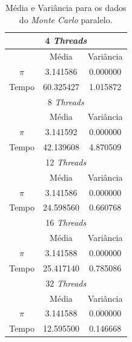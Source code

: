 \documentclass[11pt,twoside]{article}
\begin{document}
        \begin{table}[ht]
        \centering
            \begin{tabular}{|c|c|c|}
            \hline
            
            \multicolumn{3}{|c|}{ 4 {\it Threads} } \\ \hline
            
             & Média & Variância \\ \hline
             $\pi$ & 3.141586 & 0.000000 \\ \hline
            Tempo & 60.325427 & 1.015872 \\ \hline
            
            \multicolumn{3}{|c|}{ 8 {\it Threads} } \\ \hline
            
             & Média & Variância \\ \hline
            $\pi$ & 3.141592 & 0.000000 \\ \hline
            Tempo & 42.139608 & 4.870509 \\ \hline
            
            \multicolumn{3}{|c|}{ 12 {\it Threads} } \\ \hline
            
             & Média & Variância \\ \hline
             $\pi$ & 3.141586 & 0.000000 \\ \hline
            Tempo & 24.598560 & 0.660768 \\ \hline
            
            \multicolumn{3}{|c|}{ 16 {\it Threads} } \\ \hline
            
             & Média & Variância \\ \hline
            $\pi$ & 3.141588 & 0.000000 \\ \hline
            Tempo & 25.417140 & 0.785086 \\ \hline
            
            \multicolumn{3}{|c|}{ 32 {\it Threads} } \\ \hline
            
             & Média & Variância \\ \hline
             $\pi$ & 3.141588 & 0.000000 \\ \hline
            Tempo & 12.595500 & 0.146668 \\ \hline
            
            
            \end{tabular}
        \caption{Média e Variância para os dados do {\it Monte Carlo} paralelo.}
        \label{tab:montecarlo_par}
        \end{table}
    
\end{document}
